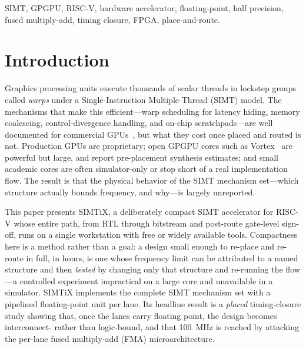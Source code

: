 \documentclass[10pt,conference]{IEEEtran}
\begin{document}
\begin{IEEEkeywords}
SIMT, GPGPU, RISC-V, hardware accelerator, floating-point, half precision,
fused multiply-add, timing closure, FPGA, place-and-route.
\end{IEEEkeywords}

\section{Introduction}
Graphics processing units execute thousands of scalar threads in lockstep groups
called \emph{warps} under a Single-Instruction Multiple-Thread (SIMT) model. The
mechanisms that make this efficient---warp scheduling for latency hiding, memory
coalescing, control-divergence handling, and on-chip scratchpads---are well
documented for commercial GPUs~\cite{hennessy,aamodt}, but what they cost once
placed and routed is not. Production GPUs are proprietary; open GPGPU cores such
as Vortex~\cite{vortex} are powerful but large, and report pre-placement
synthesis estimates; and small academic cores are often simulator-only or stop
short of a real implementation flow. The result is that the physical behavior of
the SIMT mechanism set---which structure actually bounds frequency, and why---is
largely unreported.

This paper presents SIMTiX, a deliberately compact SIMT accelerator for RISC-V
whose entire path, from RTL through bitstream and post-route gate-level sign-off,
runs on a single workstation with free or widely available tools. Compactness here
is a method rather than a goal: a design small enough to re-place and re-route in
full, in hours, is one whose frequency limit can be attributed to a named
structure and then \emph{tested} by changing only that structure and re-running
the flow---a controlled experiment impractical on a large core and unavailable in
a simulator. SIMTiX implements the complete SIMT mechanism set with a pipelined
floating-point unit per lane. Its headline result is a \emph{placed}
timing-closure study showing that, once the lanes carry floating point, the design
becomes interconnect- rather than logic-bound, and that 100~MHz is reached by
attacking the per-lane fused multiply-add (FMA) microarchitecture.
\end{document}
